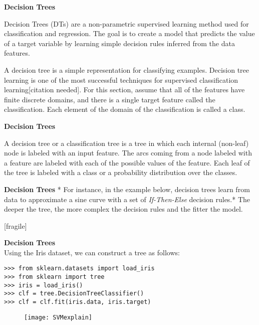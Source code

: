 


 
  
\textbf{Decision Trees}
 
   Decision Trees (DTs) are a non-parametric supervised learning method used for classification and regression.  The goal is to create a model that predicts the value of a target variable by learning simple decision rules inferred from the data features.
 
 

 
 A decision tree is a simple representation for classifying examples. Decision tree learning is one of the most successful techniques for supervised classification learning[citation needed]. For this section, assume that all of the features have finite discrete domains, and there is a single target feature called the classification. Each element of the domain of the classification is called a class. 
 
 
  
 \textbf{Decision Trees}
  
   A decision tree or a classification tree is a tree in which each internal (non-leaf) node is labeled with an input feature. 
   The arcs coming from a node labeled with a feature are labeled with each of the possible values of the feature.
   Each leaf of the tree is labeled with a class or a probability distribution over the classes.

 
 
 
  
\textbf{Decision Trees}
* For instance, in the example below, decision trees learn from data to approximate a sine curve with a set of \textit{If-Then-Else} decision rules.* The deeper the tree, the more complex the decision rules and the fitter the model.
 

 
 [fragile]
  
\textbf{Decision Trees}\\

Using the Iris dataset, we can construct a tree as follows:
{
\normalsize
\begin{framed}
\begin{verbatim}
>>> from sklearn.datasets import load_iris
>>> from sklearn import tree
>>> iris = load_iris()
>>> clf = tree.DecisionTreeClassifier()
>>> clf = clf.fit(iris.data, iris.target)
\end{verbatim}
\end{framed}
}
 

 

\begin{figure}
\centering
\texttt{[image: SVMexplain]}
\end{figure}
 
 

